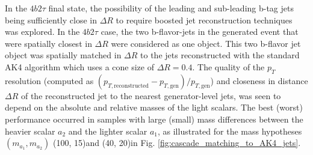 In the $4b2\tau$ final state, the possibility of the leading and sub-leading b-tag jets being sufficiently close in $\Delta R$ to require boosted jet reconstruction techniques was explored. In the $4b2\tau$ case, the two b-flavor-jets in the generated event that were spatially closest in $\Delta R$ were considered as one object. This two b-flavor jet object was spatially matched in $\Delta R$ to the jets reconstructed with the standard AK4 algorithm which uses a cone size of $\Delta R = 0.4$. The quality of the $p_{T}$ resolution (computed as $(p_{T, \text{reconstructed}} - p_{T, \text{gen}})/ p_{T, \text{gen}}$) and closeness in distance $\Delta R$ of the reconstructed jet to the nearest generator-level jets, was seen to depend on the absolute and relative masses of the light scalars. The best (worst) performance occurred in samples with large (small) mass differences between the heavier scalar $a_2$ and the lighter scalar $a_1$, as illustrated for the mass hypotheses $(m_{a_1}, m_{a_2})$ (100, 15)\GeV and (40, 20)\GeV in Fig. \ref{fig:cascade_matching_to_AK4_jets}.


